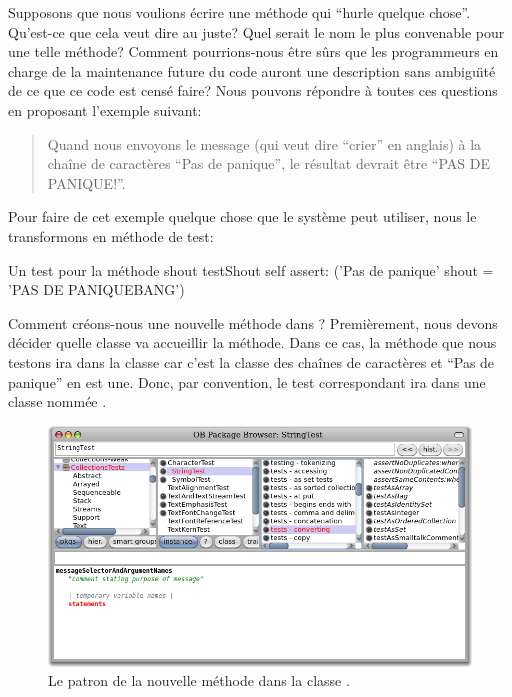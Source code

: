 \documentclass[a4paper,10pt,twoside]{book}
\begin{document}
Supposons que nous voulions écrire une méthode qui ``hurle quelque
chose''. Qu'est-ce que cela veut dire au juste? Quel serait le nom
le plus convenable pour une telle méthode? Comment pourrions-nous
être sûrs que les programmeurs en charge de la maintenance future
du code auront une description sans ambigu\"{\i}té de ce que ce code
est censé faire?
Nous pouvons répondre à toutes ces questions en proposant
l'exemple suivant:

\begin{quote}
Quand nous envoyons le message  (qui veut dire ``crier'' en anglais)
à la chaîne de caractères ``Pas de panique'', le résultat
devrait être ``PAS DE PANIQUE!''.
\end{quote}

\noindent
Pour faire de cet exemple quelque chose que le système peut
utiliser, nous le transformons en méthode de test:

\begin{method}[testShout]{Un test pour la méthode shout}
testShout
	self assert: ('Pas de panique' shout = 'PAS DE PANIQUEBANG')
\end{method} %

Comment créons-nous une nouvelle méthode dans \pharo? Premièrement,
nous devons décider quelle classe va accueillir la méthode.
Dans ce cas, la méthode  que nous testons ira dans la
classe 
car c'est la classe des chaînes de caractères et ``Pas de panique'' en est une.
Donc, par convention, le test correspondant ira dans une classe
nommée .

\begin{figure}[hbt]
	{\centerline {\includegraphics[width=\textwidth]{StringTest-newMethodTemplate}}}
\caption{Le patron de la nouvelle méthode dans la classe .
}
\end{figure}
\end{document}
